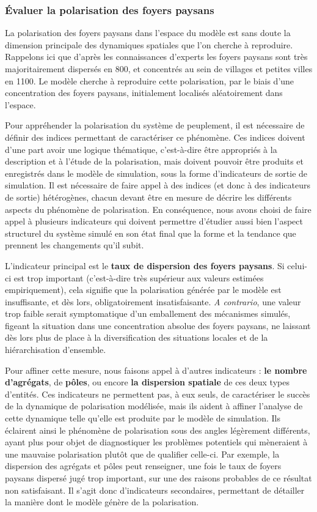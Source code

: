 \subsubsection{Évaluer la polarisation des foyers paysans \label{subsub:polarisation}}

La polarisation des foyers paysans dans l'espace du modèle est sans doute la dimension principale des dynamiques spatiales que l'on cherche à reproduire.
Rappelons ici que d'après les connaissances d'experts les foyers paysans sont très majoritairement dispersés en 800, et concentrés au sein de villages et petites villes en 1100.
Le modèle cherche à reproduire cette polarisation, par le biais d'une concentration des foyers paysans, initialement localisés aléatoirement dans l'espace.

Pour appréhender la polarisation du système de peuplement, il est nécessaire de définir des indices permettant de caractériser ce phénomène.
Ces indices doivent d'une part avoir une logique thématique, c'est-à-dire être appropriés à la description et à l'étude de la polarisation, mais doivent pouvoir être produits et enregistrés dans le modèle de simulation, sous la forme d'indicateurs de sortie de simulation.
Il est nécessaire de faire appel à des indices (et donc à des indicateurs de sortie) hétérogènes, chacun devant être en mesure de décrire les différents aspects du phénomène de polarisation.
En conséquence, nous avons choisi de faire appel à plusieurs indicateurs qui doivent permettre d'étudier aussi bien l'aspect structurel du système simulé en son état final que la forme et la tendance que prennent les changements qu'il subit.

L'indicateur principal est le \textbf{taux de dispersion des foyers paysans}.
Si celui-ci est trop important (c'est-à-dire très supérieur aux valeurs estimées empiriquement), cela signifie que la polarisation générée par le modèle est insuffisante, et dès lors, obligatoirement insatisfaisante.
\textit{A contrario}, une valeur trop faible serait symptomatique d'un emballement des mécanismes simulés, figeant la situation dans une concentration absolue des foyers paysans, ne laissant dès lors plus de place à la diversification des situations locales et de la hiérarchisation d'ensemble.

Pour affiner cette mesure, nous faisons appel à d'autres indicateurs :
\textbf{le nombre d'agrégats}, de \textbf{pôles}, ou encore \textbf{la dispersion spatiale} de ces deux types d'entités.
Ces indicateurs ne permettent pas, à eux seuls, de caractériser le succès de la dynamique de polarisation modélisée, mais ils aident à affiner l'analyse de cette dynamique telle qu'elle est produite par le modèle de simulation.
Ils éclairent ainsi le phénomène de polarisation sous des angles légèrement différents, ayant plus pour objet de diagnostiquer les problèmes potentiels qui mèneraient à une mauvaise polarisation plutôt que de qualifier celle-ci.
Par exemple, la dispersion des agrégats et pôles peut renseigner, une fois le taux de foyers paysans dispersé jugé trop important, sur une des raisons probables de ce résultat non satisfaisant.
Il s'agit donc d'indicateurs secondaires, permettant de détailler la manière dont le modèle génère de la polarisation.


